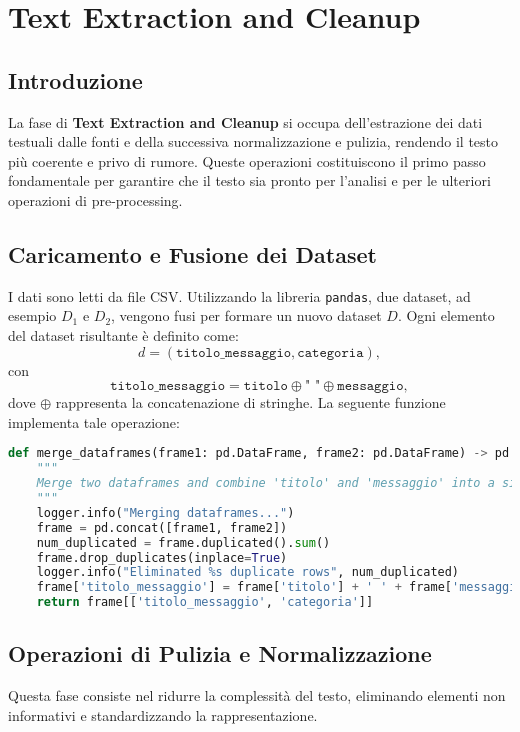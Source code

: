 \chapter{Text Extraction and Cleanup}

\section{Introduzione}
La fase di \textbf{Text Extraction and Cleanup} si occupa dell'estrazione dei dati testuali dalle fonti e della successiva normalizzazione e pulizia, rendendo il testo più coerente e privo di rumore. Queste operazioni costituiscono il primo passo fondamentale per garantire che il testo sia pronto per l'analisi e per le ulteriori operazioni di pre-processing.

\section{Caricamento e Fusione dei Dataset}
I dati sono letti da file CSV. Utilizzando la libreria \texttt{pandas}, due dataset, ad esempio $D_1$ e $D_2$, vengono fusi per formare un nuovo dataset $D$. Ogni elemento del dataset risultante è definito come:
\[
d = (\texttt{titolo\_messaggio}, \texttt{categoria}),
\]
con
\[
\texttt{titolo\_messaggio} = \texttt{titolo} \oplus \texttt{" "} \oplus \texttt{messaggio},
\]
dove $\oplus$ rappresenta la concatenazione di stringhe. La seguente funzione implementa tale operazione:

\begin{lstlisting}[language=Python,caption={Funzione per la fusione dei DataFrame}]
def merge_dataframes(frame1: pd.DataFrame, frame2: pd.DataFrame) -> pd.DataFrame:
    """
    Merge two dataframes and combine 'titolo' and 'messaggio' into a single column.
    """
    logger.info("Merging dataframes...")
    frame = pd.concat([frame1, frame2])
    num_duplicated = frame.duplicated().sum()
    frame.drop_duplicates(inplace=True)
    logger.info("Eliminated %s duplicate rows", num_duplicated)
    frame['titolo_messaggio'] = frame['titolo'] + ' ' + frame['messaggio']
    return frame[['titolo_messaggio', 'categoria']]
\end{lstlisting}

\section{Operazioni di Pulizia e Normalizzazione}
Questa fase consiste nel ridurre la complessità del testo, eliminando elementi non informativi e standardizzando la rappresentazione.

